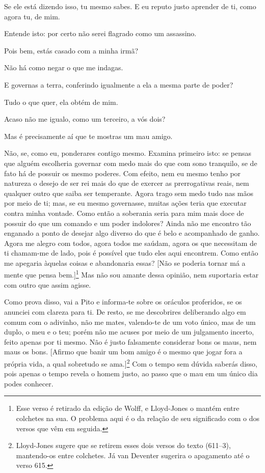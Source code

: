    Se ele está dizendo isso, tu mesmo sabes. E eu reputo justo aprender de
ti, como agora tu, de mim.

   Entende isto: por certo não serei flagrado como um assassino.

   Pois bem, estás casado com a minha irmã?

   Não há como negar o que me indagas.

   E governas a terra, conferindo igualmente a ela a mesma parte de poder?

   Tudo o que quer,  ela obtém de mim.

   Acaso não me igualo, como um terceiro, a vós dois?

   Mas é precisamente aí que te mostras um mau amigo.

   Não, se, como eu, ponderares contigo mesmo. Examina primeiro isto: se
pensas que alguém escolheria governar com medo mais do que com sono
tranquilo, se de fato há de possuir os mesmo poderes. Com efeito, nem eu
mesmo tenho por natureza o desejo de ser rei mais do que de exercer as
prerrogativas reais, nem qualquer outro que saiba ser temperante.
Agora trago sem medo tudo nas mãos por meio de ti; mas, se eu mesmo
governasse, muitas ações teria que executar contra minha vontade. Como
então a soberania seria para mim mais doce de possuir do que um comando
e um poder indolores? Ainda não me encontro tão enganado a ponto de
desejar algo diverso do que é belo e acompanhado de ganho. Agora me
alegro com todos, agora todos me saúdam, agora os que necessitam de ti
chamam-me de lado, pois é possível que tudo eles aqui encontrem. Como
então me apegaria àquelas coisas e abandonaria essas? {[}Não se
poderia tornar má a mente que pensa bem.{]}\footnote{Esse verso é
  retirado da edição de Wolff, e Lloyd-Jones o mantém entre colchetes na
  sua. O problema aqui é o da relação de seu significado com o dos
  versos que vêm em seguida.} Mas não sou amante dessa opinião, nem
suportaria estar com outro que assim agisse.

Como prova disso, vai a Pito e informa-te sobre os oráculos proferidos,
se os anunciei com clareza para ti. De resto, se me descobrires
deliberando algo em comum com o adivinho, não me mates, valendo-te de um
voto único, mas de um duplo, o meu e o teu; porém não me acuses por meio
de um julgamento incerto, feito apenas por ti mesmo. Não é justo
falsamente considerar bons os maus, nem maus os bons. {[}Afirmo que
banir um bom amigo é o mesmo que jogar fora a própria vida, a qual
sobretudo se ama.{]}\footnote{Lloyd-Jones sugere que se retirem esses
  dois versos do texto (611--3), mantendo-os entre colchetes. Já van
  Deventer sugerira o apagamento até o verso 615.} Com o tempo sem
dúvida saberás disso, pois apenas o tempo revela o homem justo, ao passo
que o mau em um único dia podes conhecer.

